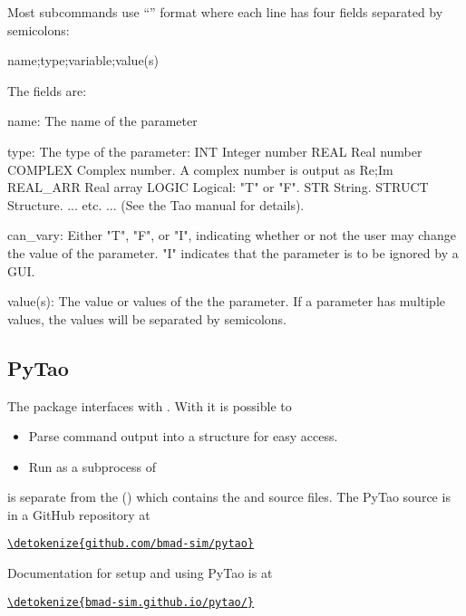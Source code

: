 \documentclass{hitec}     %
\newenvironment{display}
  {\vspace*{-1.5ex} \begin{alltt}}
  {\end{alltt} \vspace*{-1.0ex}}
\begin{document}
{Most  subcommands use ``'' format where each line has four fields
separated by semicolons:
\begin{code}
  {name};{type};{variable};{value(s)}
\end{code}
The fields are:
\begin{code}
name:       The name of the parameter

type:       The type of the parameter:
  INT           Integer number
  REAL          Real number
  COMPLEX       Complex number. A complex number is output as Re;Im
  REAL_ARR      Real array
  LOGIC         Logical: "T" or "F".
  STR           String.
  STRUCT        Structure. 
  ... etc. ... (See the Tao manual for details).

can_vary: Either "T", "F", or "I", indicating whether or not the
          user may change the value of the parameter. "I" indicates
          that the parameter is to be ignored by a GUI.

value(s): The value or values of the the parameter. If a parameter has 
          multiple values, the values will be separated by semicolons.
\end{code}



\subsection{PyTao}
\label{s:pytao}

The   package interfaces \tao with .  With  it is possible
to
\begin{itemize}
\item
Parse  command output into a  structure for easy access.
\item
Run \tao as a subprocess of 
\end{itemize}

 is separate from the \bmad {} () which contains the \bmad and
\tao source files. The PyTao source is in a GitHub repository at
\begin{display}
  \url{\detokenize{github.com/bmad-sim/pytao}}
\end{display}
Documentation for setup and using PyTao is at
\begin{display}
  \url{\detokenize{bmad-sim.github.io/pytao/}}
\end{display}
\end{document}

